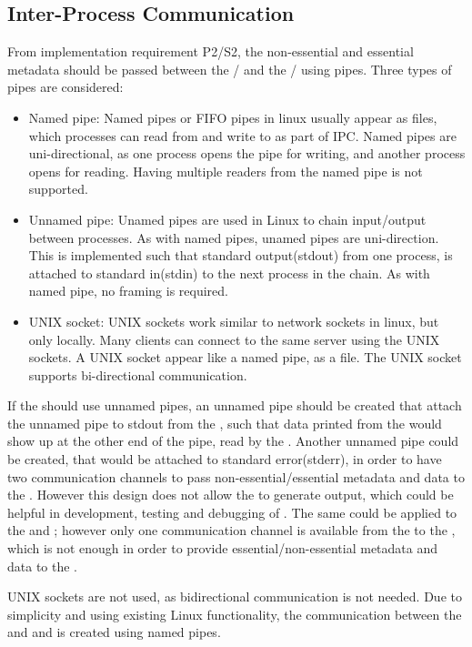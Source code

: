 \subsection{Inter-Process Communication} \label{sec:implementation:ipc}
From implementation requirement P2/S2, the non-essential and essential metadata should be passed between the \pub{}/\sub{} and the \con{}/\pro{} using pipes. Three types of pipes are considered:
\begin{itemize}
	\item Named pipe: Named pipes or FIFO pipes in linux usually appear as files, which processes can read from and write to as part of \ac{IPC}. Named pipes are uni-directional, as one process opens the pipe for writing, and another process opens for reading. Having multiple readers from the named pipe is not supported.
	
	\item Unnamed pipe: Unamed pipes are used in Linux to chain input/output between processes. As with named pipes, unamed pipes are uni-direction. This is implemented such that standard output(stdout) from one process, is attached to standard in(stdin) to the next process in the chain. As with named pipe, no framing is required.
	
	\item UNIX socket: UNIX sockets work similar to network sockets in linux, but only locally. Many clients can connect to the same server using the UNIX sockets. A UNIX socket appear like a named pipe, as a file. The UNIX socket supports bi-directional communication. 
\end{itemize}

If the \pub{} should use unnamed pipes, an unnamed pipe should be created that attach the unnamed pipe to stdout from the \pro{}, such that data printed from the \pro{} would show up at the other end of the pipe, read by the \pub{}. Another unnamed pipe could be created, that would be attached to standard error(stderr), in order to have two communication channels to pass non-essential/essential metadata and data to the \pub{}. However this design does not allow the \pro{} to generate output, which could be helpful in development, testing and debugging of \pros{}. The same could be applied to the \sub{} and \con{}; however only one communication channel is available from the \sub{} to the \con{}, which is not enough in order to provide essential/non-essential metadata and data to the \con{}.

UNIX sockets are not used, as bidirectional communication is not needed. Due to simplicity and using existing Linux functionality, the communication between the \pubs{} \subs{} and \con{} and \pro{} is created using named pipes. 


